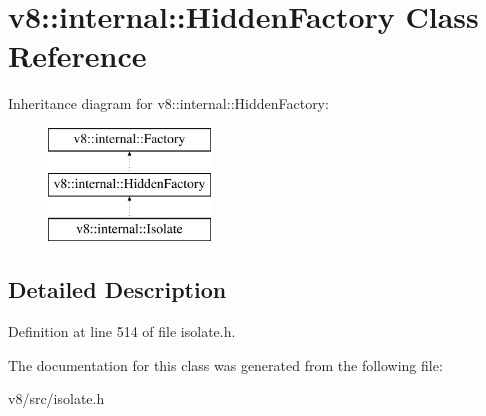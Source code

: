 \hypertarget{classv8_1_1internal_1_1HiddenFactory}{}\section{v8\+:\+:internal\+:\+:Hidden\+Factory Class Reference}
\label{classv8_1_1internal_1_1HiddenFactory}
Inheritance diagram for v8\+:\+:internal\+:\+:Hidden\+Factory\+:\begin{figure}[H]
\begin{center}
\leavevmode
\includegraphics[height=3.000000cm]{classv8_1_1internal_1_1HiddenFactory}
\end{center}
\end{figure}


\subsection{Detailed Description}


Definition at line 514 of file isolate.\+h.



The documentation for this class was generated from the following file\+:\begin{DoxyCompactItemize}
\item 
v8/src/isolate.\+h\end{DoxyCompactItemize}
